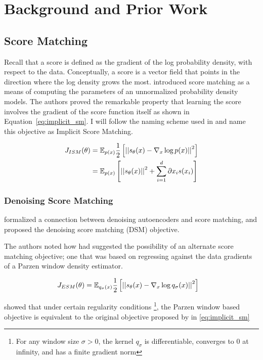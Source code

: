 \chapter{Background and Prior Work}

\section{Score Matching}
Recall that a score is defined as the gradient of the log probability density, with respect to the data. Conceptually, a score is a vector field that points in the direction where the log density grows the most. 
 introduced score matching as a means of computing the parameters of an unnormalized probability density models. The authors proved the remarkable property that learning the score involves the gradient of the score function itself as shown in Equation~\ref{eq:implicit_sm}. I will follow the naming scheme used in  and name this objective as Implicit Score Matching.

\begin{align}
\label{eq:implicit_sm}
    J_{ISM}(\theta) &= \mathbb{E}_{p(x)} \frac{1}{2} \left[ { \left|\left| {s_\theta(x) - \nabla_x \log p(x) } \right|\right|^2 } \right] \\
    &= \mathbb{E}_{p(x)} \left[ { \left|\left| {s_\theta(x)} \right|\right|^2 + \sum^{d}_{i=1}{\partial{x_{i}} s(x_{i}) } } \right]
\end{align}


\subsection{Denoising Score Matching}

 formalized a connection between denoising autoencoders and score matching, and proposed the denoising score matching (DSM) objective.

The authors noted how  had suggested the possibility of an alternate score matching objective; one that was based on regressing against the data gradients of a Parzen window density estimator.

\begin{align}
\label{eq:explicit_sm}
    J_{ESM}(\theta) &= \mathbb{E}_{q_{\sigma}(x)} \frac{1}{2} \left[ { \left|\left| {s_\theta(x) - \nabla_x \log q_{\sigma}(x) } \right|\right|^2 } \right]
\end{align}

 showed that under certain regularity conditions
\footnote{For any window size $\sigma > 0$, the kernel $q_{\sigma}$ is differentiable, converges to 0 at infinity, and has a finite gradient norm},
the Parzen window based objective is equivalent to the original objective proposed by  in \eqref{eq:implicit_sm}

